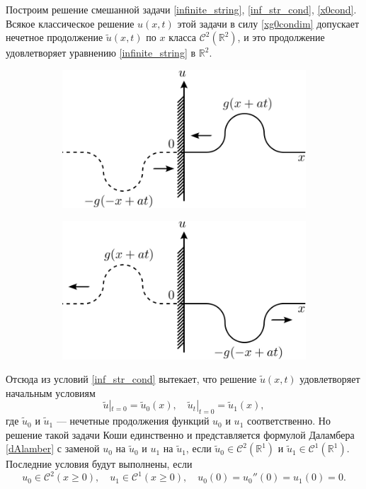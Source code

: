Построим решение смешанной задачи \eqref{infinite_string}, \eqref{inf_str_cond}, \eqref{x0cond}. Всякое классическое решение $u(x, t)$ этой задачи в силу \eqref{xg0condim} допускает нечетное продолжение $\tilde{u}(x, t)$ по $x$ класса $\mathcal{C}^2(\mathbb{R}^2)$, и это продолжение удовлетворяет уравнению \eqref{infinite_string} в $\mathbb{R}^2$.
\begin{figure}[H]
	\centering
	\begin{subfigure}{0.4\textwidth}
		\includegraphics[width=\textwidth]{img/mirror1.png}
		\caption{}
	\end{subfigure}
	\hspace{5mm}
	\begin{subfigure}{0.4\textwidth}
		\includegraphics[width=\textwidth]{img/mirror2.png}
		\caption{}
	\end{subfigure}
\end{figure}
Отсюда из условий \eqref{inf_str_cond} вытекает, что решение $\tilde{u}(x, t)$ удовлетворяет начальным условиям
\begin{equation}
	\tilde{u}|_{t = 0} = \tilde{u}_0(x), \quad \tilde{u}_t|_{t = 0} = \tilde{u}_1(x),
\end{equation}
где $\tilde{u}_0$ и $\tilde{u}_1$ --- нечетные продолжения функций $u_0$ и $u_1$ соответственно. Но решение такой задачи Коши единственно и представляется формулой Даламбера \eqref{dAlamber} с заменой $u_0$ на $\tilde{u}_0$ и $u_1$ на $\tilde{u}_1$, если $\tilde{u}_0 \in \mathcal{C}^2(\mathbb{R}^1)$ и $\tilde{u}_1 \in \mathcal{C}^1(\mathbb{R}^1)$. Последние условия будут выполнены, если
\begin{equation} \label{setcond}
	u_0 \in \mathcal{C}^2(x \geqslant 0), \quad u_1 \in \mathcal{C}^1(x \geqslant 0), \quad u_0(0) = u_0''(0) = u_1(0) = 0.
\end{equation}


